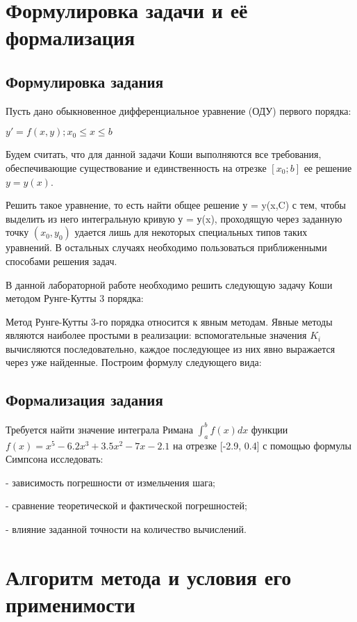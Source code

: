 \documentclass{article}
\begin{document}
	\newpage
	
	\section{Формулировка задачи и её формализация}
	\subsection{Формулировка задания}
	Пусть дано обыкновенное дифференциальное уравнение (ОДУ) первого порядка:
	\begin{center}
	$y' = f(x,y); x_0 \leq x \leq b$
	\end{center}
	Будем считать, что для данной задачи Коши выполняются все требования, обеспечивающие существование и единственность на отрезке $[x_0; b]$ ее решение $y = y(x)$.
	
	Решить такое уравнение, то есть найти общее решение у = y(x,C) с тем, чтобы выделить из него интегральную кривую у = у(x), проходящую через заданную точку $(x_0, y_0)$ удается лишь для некоторых специальных типов таких уравнений. В остальных случаях необходимо пользоваться приближенными
	способами решения задач.
	
	В данной лабораторной работе необходимо решить следующую задачу Коши методом Рунге-Кутты 3 порядка:
	
	Метод Рунге-Кутты 3-го порядка относится к явным методам. Явные методы являются наиболее простыми в реализации: вспомогательные значения $K_i$ вычисляются последовательно, каждое последующее из них явно выражается через уже найденные.
	Построим формулу следующего вида:

	\subsection{Формализация задания}
	Требуется найти значение интеграла Римана $\int_a^b f(x)dx$ функции $f(x) = x^5 - 6.2x^3 + 3.5x^2 -7x -2.1$ на отрезке [-2.9, 0.4] с помощью формулы Симпсона исследовать:
	
	- зависимость погрешности от измельчения шага;
	
	- сравнение теоретической и фактической погрешностей;
	
	- влияние заданной точности на количество вычислений.
	\section{Алгоритм метода и условия его применимости}   
	
\end{document}
